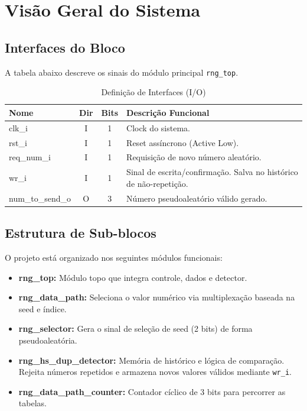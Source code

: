 \documentclass[12pt, a4paper]{article}
\begin{document}
	\section{Visão Geral do Sistema}
	
	\subsection{Interfaces do Bloco}
	A tabela abaixo descreve os sinais do módulo principal \texttt{rng\_top}.
	
	\begin{table}[H]
		\centering
		\begin{tabularx}{\textwidth}{l c c X}
			\toprule
			\textbf{Nome} & \textbf{Dir} & \textbf{Bits} & \textbf{Descrição Funcional} \\
			\midrule
			clk\_i & I & 1 & Clock do sistema. \\
			rst\_i & I & 1 & Reset assíncrono (Active Low). \\
			req\_num\_i & I & 1 & Requisição de novo número aleatório. \\
			wr\_i & I & 1 & Sinal de escrita/confirmação. Salva no histórico de não-repetição. \\
			num\_to\_send\_o & O & 3 & Número pseudoaleatório válido gerado. \\
			\bottomrule
		\end{tabularx}
		\caption{Definição de Interfaces (I/O)}
		\label{tab:io_desc}
	\end{table}
	
	\subsection{Estrutura de Sub-blocos}
	O projeto está organizado nos seguintes módulos funcionais:
	
	\begin{itemize}
		\item \textbf{rng\_top:} Módulo topo que integra controle, dados e detector.
		\item \textbf{rng\_data\_path:} Seleciona o valor numérico via multiplexação baseada na seed e índice.
		\item \textbf{rng\_selector:} Gera o sinal de seleção de seed (2 bits) de forma pseudoaleatória.
		\item \textbf{rng\_hs\_dup\_detector:} Memória de histórico e lógica de comparação. Rejeita números repetidos e armazena novos valores válidos mediante \texttt{wr\_i}.
		\item \textbf{rng\_data\_path\_counter:} Contador cíclico de 3 bits para percorrer as tabelas.
	\end{itemize}
	
\end{document}
